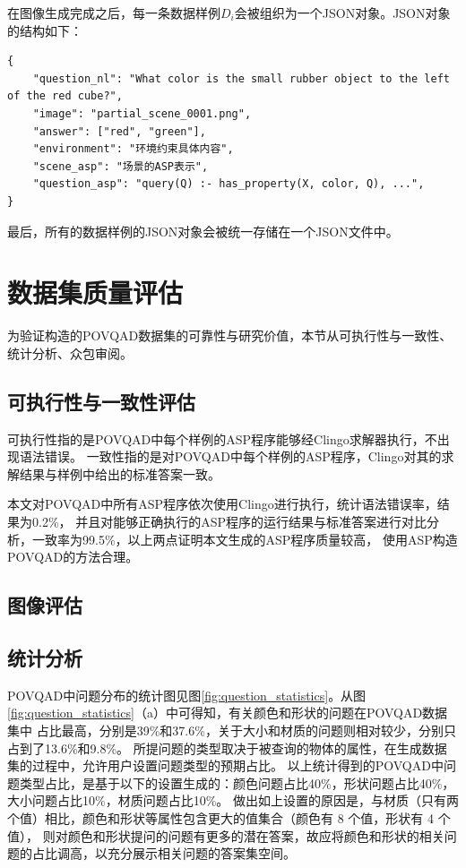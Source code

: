 在图像生成完成之后，每一条数据样例$D_i$会被组织为一个JSON对象。JSON对象的结构如下：
\begin{lstlisting}
{
    "question_nl": "What color is the small rubber object to the left of the red cube?",
    "image": "partial_scene_0001.png",
    "answer": ["red", "green"],
    "environment": "环境约束具体内容",
    "scene_asp": "场景的ASP表示",
    "question_asp": "query(Q) :- has_property(X, color, Q), ...",
}
\end{lstlisting}

最后，所有的数据样例的JSON对象会被统一存储在一个JSON文件中。
\section{数据集质量评估}
为验证构造的POVQAD数据集的可靠性与研究价值，本节从可执行性与一致性、统计分析、众包审阅。
\subsection{可执行性与一致性评估}
可执行性指的是POVQAD中每个样例的ASP程序能够经Clingo求解器执行，不出现语法错误。
一致性指的是对POVQAD中每个样例的ASP程序，Clingo对其的求解结果与样例中给出的标准答案一致。

本文对POVQAD中所有ASP程序依次使用Clingo进行执行，统计语法错误率，结果为0.2\%，
并且对能够正确执行的ASP程序的运行结果与标准答案进行对比分析，一致率为99.5\%，以上两点证明本文生成的ASP程序质量较高，
使用ASP构造POVQAD的方法合理。
\subsection{图像评估}

\subsection{统计分析}
POVQAD中问题分布的统计图见图\ref{fig:question_statistics}。从图\ref{fig:question_statistics}（a）中可得知，有关颜色和形状的问题在POVQAD数据集中
占比最高，分别是39\%和37.6\%，关于大小和材质的问题则相对较少，分别只占到了13.6\%和9.8\%。
所提问题的类型取决于被查询的物体的属性，在生成数据集的过程中，允许用户设置问题类型的预期占比。
以上统计得到的POVQAD中问题类型占比，是基于以下的设置生成的：颜色问题占比40\%，形状问题占比40\%，大小问题占比10\%，材质问题占比10\%。
做出如上设置的原因是，与材质（只有两个值）相比，颜色和形状等属性包含更大的值集合（颜色有 8 个值，形状有 4 个值），
则对颜色和形状提问的问题有更多的潜在答案，故应将颜色和形状的相关问题的占比调高，以充分展示相关问题的答案集空间。

